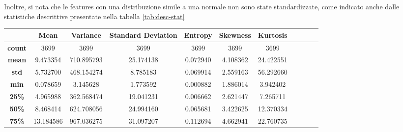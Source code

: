 Inoltre, si nota che le features con una distribuzione simile a una normale non
sono state standardizzate, come indicato anche dalle statistiche descrittive
presentate nella tabella \ref{tab:desc-stat}
\begin{table}[!ht]
      \begin{subtable}[h]{1\textwidth}
            \centering
            \begin{tabular}{c|c c c c c c c c c c}
                  \hline
                  \rowcolor[HTML]{EFEFEF} \cellcolor[HTML]{EFEFEF}\textbf{} & \textbf{Mean} & \textbf{Variance} & \textbf{Standard Deviation} & \cellcolor[HTML]{EFEFEF}\textbf{Entropy} & \textbf{Skewness} & \textbf{Kurtosis} \\ \hline
                  \textbf{count}                                            & 3699          & 3699              & 3699                        & 3699                                     & 3699              & 3699              \\
                  \textbf{mean}                                             & 9.473354      & 710.895793        & 25.174138                   & 0.072940                                 & 4.108362          & 24.422551         \\
                  \textbf{std}                                              & 5.732700      & 468.154274        & 8.785183                    & 0.069914                                 & 2.559163          & 56.292660         \\
                  \textbf{min}                                              & 0.078659      & 3.145628          & 1.773592                    & 0.000882                                 & 1.886014          & 3.942402          \\
                  \textbf{25\%}                                             & 4.965988      & 362.568474        & 19.041231                   & 0.006662                                 & 2.621447          & 7.265711          \\
                  \textbf{50\%}                                             & 8.468414      & 624.708056        & 24.994160                   & 0.065681                                 & 3.422625          & 12.370334         \\
                  \textbf{75\%}                                             & 13.184586     & 967.036275        & 31.097207                   & 0.112694                                 & 4.662941          & 22.760735         \\

\end{tabular}
\end{subtable}
\end{table}
